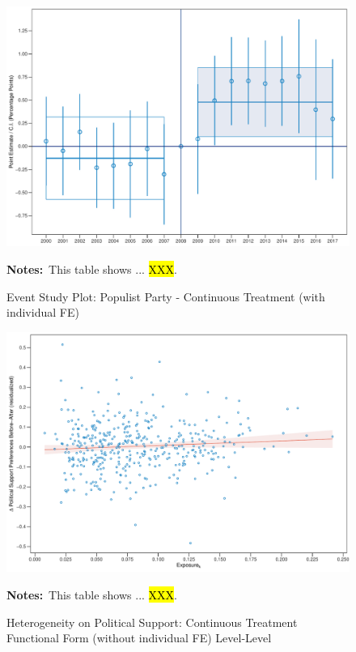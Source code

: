 \documentclass[11pt]{article}
\begin{document}
\begin{figure}[htbp!]
    \centering
    \caption{Event Study Plot: Populist Party - Continuous Treatment (with individual FE)}\label{fig:dynamic_did_cbk_past_mean_pp_std_ife}
    \includegraphics[width=1\linewidth]{events/dynamic_did_cbk_past_mean_pp_std_ife}
    \begin{tablenotes}
        \footnotesize
        \item \textbf{Notes:}~This table shows ... \hl{XXX}.
    \end{tablenotes} 
\end{figure}


\begin{figure}[htbp!]
    \centering
    \caption{Heterogeneity on Political Support: Continuous Treatment Functional Form (without individual FE) Level-Level}\label{fig:ps_functional_form_cbk_past_mean_noife_levels}
    \includegraphics[width=1\linewidth]{heterogeneity/ps_functional_form_cbk_past_mean_noife_levels}
    \begin{tablenotes}
        \footnotesize
        \item \textbf{Notes:}~This table shows ... \hl{XXX}.
    \end{tablenotes} 
\end{figure}
\end{document}
